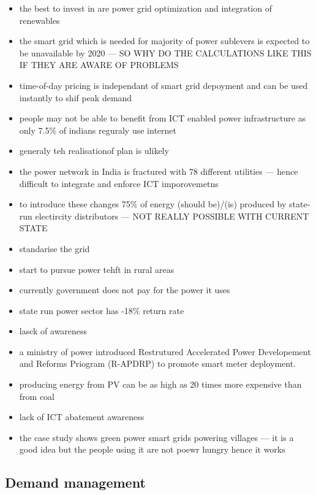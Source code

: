 \documentclass[11pt, twocolumn]{article}
\begin{document}
\begin{itemize}
\item the best to invest in are power grid optimization and integration of renewables
\item the smart grid which is needed for majority of power sublevers is expected to be unavailable by 2020 --- SO WHY DO THE CALCULATIONS LIKE THIS IF THEY ARE AWARE OF PROBLEMS
\item time-of-day pricing is independant of smart grid depoyment and can be used instantly to shif peak demand
\item people may not be able to benefit from ICT enabled power infrastructure as only 7.5\% of indians reguraly use internet
\item generaly teh realisationof plan is ulikely
\item the power network in India is fractured with 78 different utilities --- hence difficult to integrate and enforce ICT imporovemetns
\item to introduce these changes 75\% of energy (should be)/(is) produced by state-run electircity distributors --- NOT REALLY POSSIBLE WITH CURRENT STATE
\item standarise the grid
\item start to pursue power tehft in rural areas
\item currently government does not pay for the power it uses
\item state run power sector has -18\% return rate
\item lasck of awareness
\item a ministry of power introduced Restrutured Accelerated Power Developement and Reforms Priogram (R-APDRP) to promote smart meter deployment.
\item producing energy from PV can be as high as 20 times more expensive than from coal
\item lack of ICT abatement awareness
\item the case study shows green power smart grids powering villages --- it is a good idea but the people using it are not poewr hungry hence it works

\end{itemize}

\subsection{Demand management}
\end{document}
